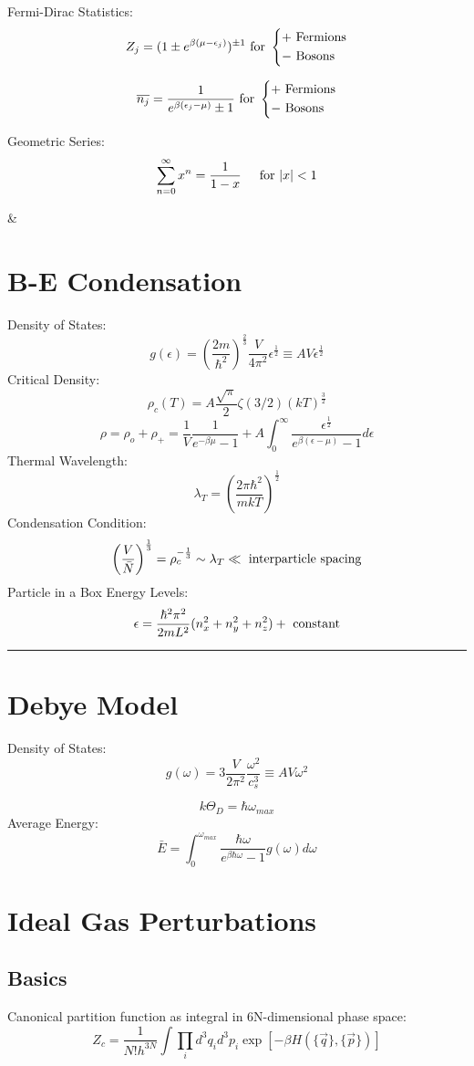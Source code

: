 \documentclass[table,cmyk]{article}
\begin{document}
\begin{longtable}
Fermi-Dirac Statistics:
\[Z_{j} = (1\pm e^{\beta(\mu - \epsilon_{j})})^{\pm1} \textmd{ for }
\begin{dcases}
	+ \textmd{ Fermions}\\
	- \textmd{ Bosons}
\end{dcases}
\]

\[ \overline{n_{j}} = \frac{1}{e^{\beta(\epsilon_{j} - \mu)} \pm 1} \textmd{ for }
\begin{dcases}
	+ \textmd{ Fermions}\\
	- \textmd{ Bosons}
\end{dcases}\]

Geometric Series:
\[\sum_{n=0}^{\infty} x^n = \frac{1}{1-x} \textmd{\hspace{0.5cm}for } |x| < 1\]

&
\section*{B-E Condensation}
Density of States:
\[g(\epsilon) = \left(\frac{2m}{\hbar^2}\right)^{\frac{2}{3}} \frac{V}{4\pi^2}\epsilon^{\frac{1}{2}} \equiv AV \epsilon^{\frac{1}{2}}\]
Critical Density:
\[\rho_{c}(T) = A \frac{\sqrt{\pi}}{2} \zeta(3/2)(kT)^{\frac{3}{2}}\]
\[\rho = \rho_{o} + \rho_{+} = \frac{1}{V} \frac{1}{e^{-\beta \mu} -1} + A \int_{0}^{\infty}\frac{\epsilon^{\frac{1}{2}}}{e^{\beta(\epsilon-\mu)}-1}d\epsilon\]
Thermal Wavelength:
\[\lambda_{T} = \left(\frac{2\pi\hbar^2}{mkT}\right)^{\frac{1}{2}}\]
Condensation Condition:
\[\left(\frac{V}{\bar{N}}\right)^{\frac{1}{3}} = \rho_{c}^{-\frac{1}{3}} \sim \lambda_{T} \ll \textmd{ interparticle spacing}\]
Particle in a Box Energy Levels:
\[\epsilon = \frac{\hbar^2\pi^2}{2mL^2}(n_{x}^2+n_{y}^2+n_{z}^2)+\textmd{ constant}\]
\noindent\rule{7.8cm}{0.4pt}
\section*{Debye Model}
Density of States:
\[g(\omega) = 3 \frac{V}{2\pi^2}\frac{\omega^2}{c_{s}^3} \equiv AV\omega^2\]

\[k\Theta_{D} = \hbar \omega_{max}\]
Average Energy:
\[\bar{E} = \int_{0}^{\omega_{max}} \frac{\hbar \omega}{e^{\beta \hbar \omega} - 1}g(\omega)d\omega\]
\tabularnewline\hline

\section*{Ideal Gas Perturbations}
\subsection*{Basics}
Canonical partition function as integral in 6N-dimensional phase space:
\[Z_c= \frac{1}{N!h^{3N}} \int \prod_{i} d^{3}q_i d^{3} p_i \exp[-\beta H (\{\vec{q}\},\{\vec{p}\})]\]


\end{longtable}
\end{document}
